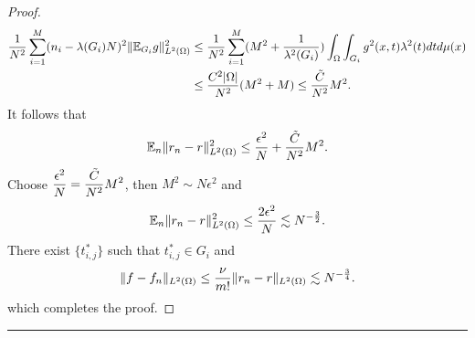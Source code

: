 \begin{proof}
\begin{align}
 {1\over N^2}\sum_{i=1}^M (n_i - \lambda(G_i)N)^2  \|\mathbb{E}_{G_i}g\|_{L^2(\Omega)}^2& \le {1 \over N^2}\sum_{i=1}^M  (M^2 + {1\over \lambda^2(G_i)}) \int_\Omega \int_{G_i} g^2(x, t)\lambda^2(t)dt d\mu(x)
\\
&\le  {C^2|\Omega|\over N^2}(M^2 +M)\le {\tilde C\over N^2}M^2.
\end{align}  
It follows that 
\begin{align}  
\mathbb{E}_n \|r_{n} - r \|_{L^2(\Omega)}^2 
\le {\epsilon^2 \over N} + {\tilde C\over N^2}M^2\label{stratify2t}.
\end{align}  
Choose $\displaystyle {\epsilon^2 \over N} = {\tilde C\over N^2}M^2$, then $M^2\sim N\epsilon^2$ and 
$$
\mathbb{E}_n \|r_{n} - r \|_{L^2(\Omega)}^2 \le {2\epsilon^2 \over N} \lesssim N^{-{3\over 2}}.
$$ 
There exist $\{t_{i,j}^\ast\}$ such that $t_{i,j}^\ast\in G_i$ and 
\begin{equation}
\| f -  f_n \|_{L^2(\Omega)}\le {\nu\over m!}\|r_{n} - r\|_{L^2(\Omega)}\lesssim N^{-{3\over 4}}.
\end{equation}
which completes the proof. 

\end{proof}




\hrule

